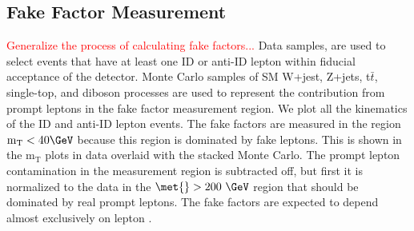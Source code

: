   \FloatBarrier
  
 \subsection{Fake Factor Measurement}
   \textcolor{red}{Generalize the process of calculating fake factors...}  Data samples, are used to select events that have at least one ID or anti-ID lepton within fiducial acceptance of the detector.  Monte Carlo samples of SM W+jest, Z+jets, t$\bar t$, single-top, and diboson processes are used to represent the contribution from prompt leptons in the fake factor measurement region.  We plot all the kinematics of the ID and anti-ID lepton events.  The fake factors are measured in the region $\mathrm{m_T} < 40\GeV$ because this region is dominated by fake leptons.  This is shown in the $\mathrm{m_T}$ plots in data overlaid with the stacked Monte Carlo.  The prompt lepton contamination in the measurement region is subtracted off, but first it is normalized to the data in the $\met{} > 200~\GeV$ region that should be dominated by real prompt leptons.  The fake factors are expected to depend almost exclusively on lepton \pt. 
